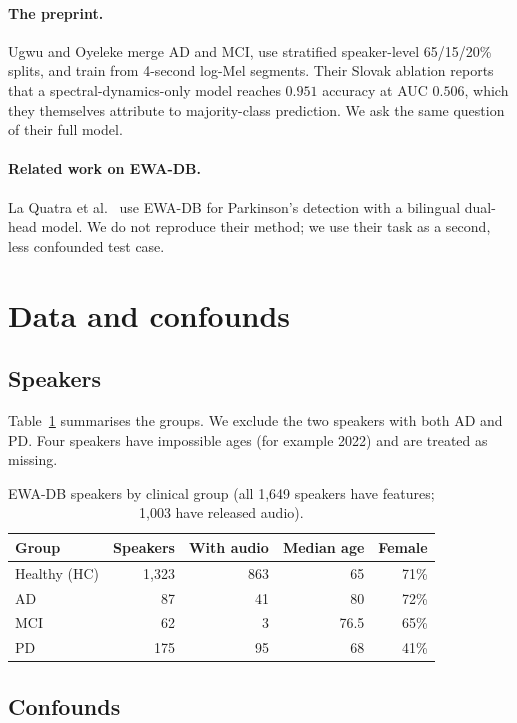\documentclass[10pt]{article}
\begin{document}
\paragraph{The preprint.} Ugwu and Oyeleke \cite{ugwu2026} merge AD and MCI, use stratified speaker-level 65/15/20\% splits, and train from 4-second log-Mel segments. Their Slovak ablation reports that a spectral-dynamics-only model reaches $0.951$ accuracy at AUC $0.506$, which they themselves attribute to majority-class prediction. We ask the same question of their full model.

\paragraph{Related work on EWA-DB.} La Quatra et al.\ \cite{laquatra2025} use EWA-DB for Parkinson's detection with a bilingual dual-head model. We do not reproduce their method; we use their task as a second, less confounded test case.

\section{Data and confounds}\label{sec:data}
\subsection{Speakers}
Table~\ref{tab:groups} summarises the groups. We exclude the two speakers with both AD and PD. Four speakers have impossible ages (for example 2022) and are treated as missing.

\begin{table}[t]
\centering\small
\begin{tabular}{lrrrr}
\toprule
Group & Speakers & With audio & Median age & Female\\
\midrule
Healthy (HC) & 1,323 & 863 & 65 & 71\%\\
AD & 87 & 41 & 80 & 72\%\\
MCI & 62 & 3 & 76.5 & 65\%\\
PD & 175 & 95 & 68 & 41\%\\
\bottomrule
\end{tabular}
\caption{EWA-DB speakers by clinical group (all 1,649 speakers have features; 1,003 have released audio).}
\label{tab:groups}
\end{table}

\subsection{Confounds}
\end{document}
